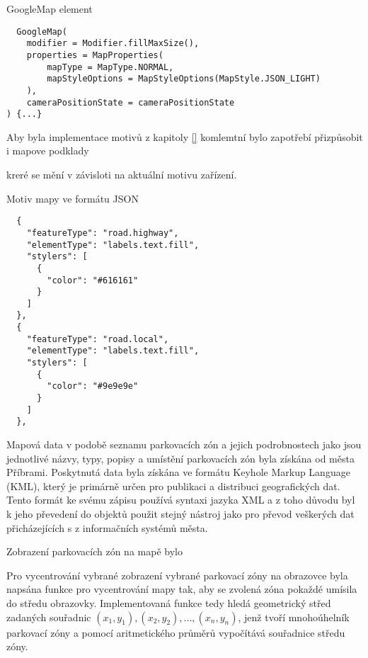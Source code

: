 
\begin{listing}
\caption{GoogleMap element}\label{lst:GoogleMapview}
\begin{verbatim}
  GoogleMap(
    modifier = Modifier.fillMaxSize(),
    properties = MapProperties(
        mapType = MapType.NORMAL,
        mapStyleOptions = MapStyleOptions(MapStyle.JSON_LIGHT)
    ),
    cameraPositionState = cameraPositionState
) {...}
\end{verbatim}
\end{listing}


Aby byla implementace motivů z kapitoly \ref{} komlemtní bylo zapotřebí přizpůsobit i mapove podklady

kreré se mění v závisloti na aktuální motivu zařízení.
\begin{listing}
\caption{Motiv mapy ve formátu JSON}\label{lst:MapStyle}
\begin{verbatim}
  {
    "featureType": "road.highway",
    "elementType": "labels.text.fill",
    "stylers": [
      {
        "color": "#616161"
      }
    ]
  },
  {
    "featureType": "road.local",
    "elementType": "labels.text.fill",
    "stylers": [
      {
        "color": "#9e9e9e"
      }
    ]
  },
\end{verbatim}
\end{listing}

Mapová data v podobě seznamu parkovacích zón a jejich podrobnostech jako jsou jednotlivé názvy, typy, popisy a umístění parkovacích zón byla 
získána od města Příbrami. Poskytnutá data byla získána ve formátu Keyhole Markup Language (KML), který je primárně určen pro publikaci a 
distribuci geografických dat. Tento formát ke svému zápisu používá syntaxi jazyka XML a z toho důvodu byl k jeho převedení do objektů 
použit stejný nástroj jako pro převod veškerých dat přicházejících s z informačních systémů města.

Zobrazení parkovacích zón na mapě bylo 

Pro vycentrování vybrané zobrazení vybrané parkovací zóny na obrazovce byla napsána funkce pro vycentrování mapy tak, aby se zvolená zóna pokaždé 
umísila do středu obrazovky. Implementovaná funkce tedy hledá geometrický střed zadaných souřadnic \( (x_1, y_1), (x_2, y_2), ..., (x_n, y_n)\), 
jenž tvoří mnohoúhelník parkovací zóny a pomocí aritmetického průměrů vypočítává souřadnice středu zóny.

